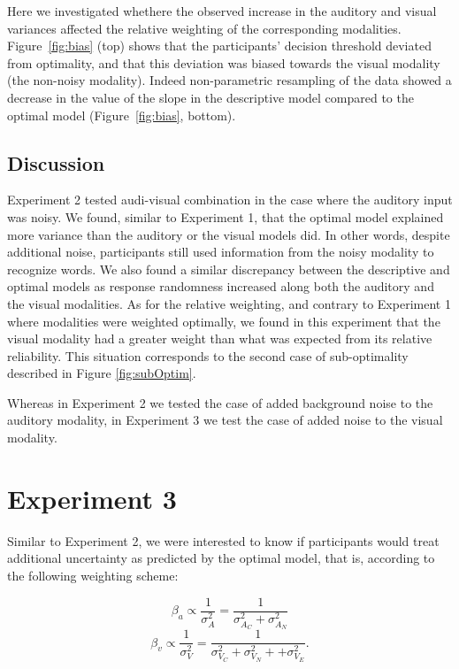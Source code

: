 \documentclass[english,,man,floatsintext]{apa6}
\theoremstyle{definition}
\theoremstyle{definition}
\theoremstyle{definition}
\theoremstyle{remark}
\begin{document}
Here we investigated whethere the observed increase in the auditory and
visual variances affected the relative weighting of the corresponding
modalities. Figure~\ref{fig:bias} (top) shows that the participants'
decision threshold deviated from optimality, and that this deviation was
biased towards the visual modality (the non-noisy modality). Indeed
non-parametric resampling of the data showed a decrease in the value of
the slope in the descriptive model compared to the optimal model
(Figure~\ref{fig:bias}, bottom).

\subsection{Discussion}\label{discussion-1}

Experiment 2 tested audi-visual combination in the case where the
auditory input was noisy. We found, similar to Experiment 1, that the
optimal model explained more variance than the auditory or the visual
models did. In other words, despite additional noise, participants still
used information from the noisy modality to recognize words. We also
found a similar discrepancy between the descriptive and optimal models
as response randomness increased along both the auditory and the visual
modalities. As for the relative weighting, and contrary to Experiment 1
where modalities were weighted optimally, we found in this experiment
that the visual modality had a greater weight than what was expected
from its relative reliability. This situation corresponds to the second
case of sub-optimality described in Figure \ref{fig:subOptim}.

Whereas in Experiment 2 we tested the case of added background noise to
the auditory modality, in Experiment 3 we test the case of added noise
to the visual modality.

\section{Experiment 3}\label{experiment-3}

Similar to Experiment 2, we were interested to know if participants
would treat additional uncertainty as predicted by the optimal model,
that is, according to the following weighting scheme:

\[\beta_a \propto \frac{1}{\sigma^2_{A}} = \frac{1}{\sigma^2_{A_C}+\sigma^2_{A_N}}\]
\[\beta_v \propto \frac{1}{\sigma^2_{V}} = \frac{1}{\sigma^2_{V_C}+\sigma^2_{V_N} + + \sigma^2_{V_E}}.\]
\end{document}
